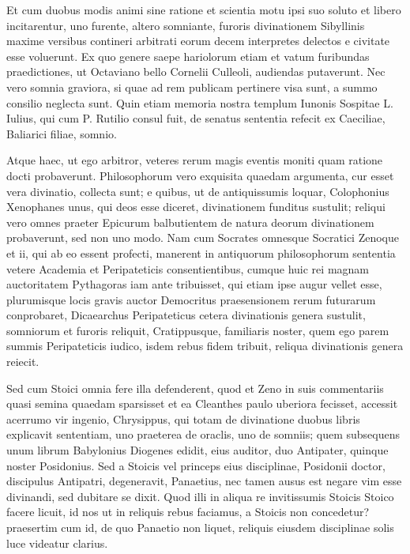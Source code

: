  Et cum duobus modis animi sine ratione et scientia motu ipsi suo soluto et libero incitarentur, uno furente, altero somniante, furoris divinationem Sibyllinis maxime versibus contineri arbitrati eorum decem interpretes delectos e civitate esse voluerunt. Ex quo genere saepe hariolorum etiam et vatum furibundas praedictiones, ut Octaviano bello Cornelii Culleoli, audiendas putaverunt. Nec vero somnia graviora, si quae ad rem publicam pertinere visa sunt, a summo consilio neglecta sunt. Quin etiam memoria nostra templum Iunonis Sospitae L. Iulius, qui cum P. Rutilio consul fuit, de senatus sententia refecit ex Caeciliae, Baliarici filiae, somnio.

 Atque haec, ut ego arbitror, veteres rerum magis eventis moniti quam ratione docti probaverunt. Philosophorum vero exquisita quaedam argumenta, cur esset vera divinatio, collecta sunt; e quibus, ut de antiquissumis loquar, Colophonius Xenophanes unus, qui deos esse diceret, divinationem funditus sustulit; reliqui vero omnes praeter Epicurum balbutientem de natura deorum divinationem probaverunt, sed non uno modo. Nam cum Socrates omnesque Socratici Zenoque et ii, qui ab eo essent profecti, manerent in antiquorum philosophorum sententia vetere Academia et Peripateticis consentientibus, cumque huic rei magnam auctoritatem Pythagoras iam ante tribuisset, qui etiam ipse augur vellet esse, plurumisque locis gravis auctor Democritus praesensionem rerum futurarum conprobaret, Dicaearchus Peripateticus cetera divinationis genera sustulit, somniorum et furoris reliquit, Cratippusque, familiaris noster, quem ego parem summis Peripateticis iudico, isdem rebus fidem tribuit, reliqua divinationis genera reiecit.

 Sed cum Stoici omnia fere illa defenderent, quod et Zeno in suis commentariis quasi semina quaedam sparsisset et ea Cleanthes paulo uberiora fecisset, accessit acerrumo vir ingenio, Chrysippus, qui totam de divinatione duobus libris explicavit sententiam, uno praeterea de oraclis, uno de somniis; quem subsequens unum librum Babylonius Diogenes edidit, eius auditor, duo Antipater, quinque noster Posidonius. Sed a Stoicis vel princeps eius disciplinae, Posidonii doctor, discipulus Antipatri, degeneravit, Panaetius, nec tamen ausus est negare vim esse divinandi, sed dubitare se dixit. Quod illi in aliqua re invitissumis Stoicis Stoico facere licuit, id nos ut in reliquis rebus faciamus, a Stoicis non concedetur? praesertim cum id, de quo Panaetio non liquet, reliquis eiusdem disciplinae solis luce videatur clarius.

